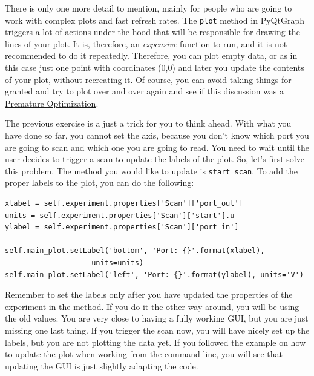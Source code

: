 There is only one more detail to mention, mainly for people who are
going to work with complex plots and fast refresh rates. The
\texttt{plot} method in PyQtGraph triggers a lot of actions under the
hood that will be responsible for drawing the lines of your plot. It is,
therefore, an \emph{expensive} function to run, and it is not
recommended to do it repeatedly. Therefore, you can plot empty data, or
as in this case just one point with coordinates (0,0) and later you
update the contents of your plot, without recreating it. Of course, you
can avoid taking things for granted and try to plot over and over again
and see if this discussion was a
\href{http://wiki.c2.com/?PrematureOptimization}{Premature
Optimization}.


The previous exercise is a just a trick for you to think ahead. With
what you have done so far, you cannot set the axis, because you don't
know which port you are going to scan and which one you are going to
read. You need to wait until the user decides to trigger a scan to
update the labels of the plot. So, let's first solve this problem. The
method you would like to update is \texttt{start_scan}. To add the
proper labels to the plot, you can do the following:

\begin{verbatim}
xlabel = self.experiment.properties['Scan']['port_out']
units = self.experiment.properties['Scan']['start'].u
ylabel = self.experiment.properties['Scan']['port_in']

self.main_plot.setLabel('bottom', 'Port: {}'.format(xlabel),
                    units=units)
self.main_plot.setLabel('left', 'Port: {}'.format(ylabel), units='V')
\end{verbatim}

Remember to set the labels only after you have updated the properties of
the experiment in the method. If you do it the other way around, you
will be using the old values. You are very close to having a fully
working {GUI}, but you are just missing one last thing. If you trigger
the scan now, you will have nicely set up the labels, but you are not
plotting the data yet. If you followed the example on how to update the
plot when working from the command line, you will see that updating the
{GUI} is just slightly adapting the code.

